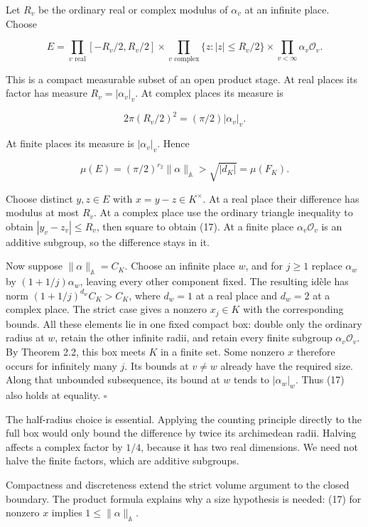 \documentclass[
  english,
  11pt,
  a4paper,
]{article}
\begin{document}
Let \(R_v\) be the ordinary real or complex modulus of \(\alpha_v\) at
an infinite place. Choose

\[E=\prod_{v\text{ real}}[-R_v/2,R_v/2]
\times\prod_{v\text{ complex}}\{z:|z|\leq R_v/2\}
\times\prod_{v<\infty}\alpha_v\mathcal O_v.
\tag{19}\]

This is a compact measurable subset of an open product stage. At real
places its factor has measure \(R_v=|\alpha_v|_v\). At complex places
its measure is

\[2\pi(R_v/2)^2=(\pi/2)|\alpha_v|_v.\]

At finite places its measure is \(|\alpha_v|_v\). Hence

\[\mu(E)=(\pi/2)^{r_2}\|\alpha\|_{\mathbb A}
>\sqrt{|d_K|}=\mu(F_K).\]

Choose distinct \(y,z\in E\) with \(x=y-z\in K^\times\). At a real place
their difference has modulus at most \(R_v\). At a complex place use the
ordinary triangle inequality to obtain \(|y_v-z_v|\leq R_v\), then
square to obtain (17). At a finite place \(\alpha_v\mathcal O_v\) is an
additive subgroup, so the difference stays in it.

Now suppose \(\|\alpha\|_{\mathbb A}=C_K\). Choose an infinite place
\(w\), and for \(j\geq1\) replace \(\alpha_w\) by \((1+1/j)\alpha_w\),
leaving every other component fixed. The resulting idèle has norm
\((1+1/j)^{d_w}C_K>C_K\), where \(d_w=1\) at a real place and \(d_w=2\)
at a complex place. The strict case gives a nonzero \(x_j\in K\) with
the corresponding bounds. All these elements lie in one fixed compact
box: double only the ordinary radius at \(w\), retain the other infinite
radii, and retain every finite subgroup \(\alpha_v\mathcal O_v\). By
Theorem 2.2, this box meets \(K\) in a finite set. Some nonzero \(x\)
therefore occurs for infinitely many \(j\). Its bounds at \(v\ne w\)
already have the required size. Along that unbounded subsequence, its
bound at \(w\) tends to \(|\alpha_w|_w\). Thus (17) also holds at
equality. \(\square\)

The half-radius choice is essential. Applying the counting principle
directly to the full box would only bound the difference by twice its
archimedean radii. Halving affects a complex factor by \(1/4\), because
it has two real dimensions. We need not halve the finite factors, which
are additive subgroups.

Compactness and discreteness extend the strict volume argument to the
closed boundary. The product formula explains why a size hypothesis is
needed: (17) for nonzero \(x\) implies \(1\leq\|\alpha\|_{\mathbb A}\).
\end{document}
